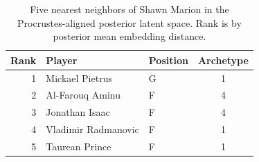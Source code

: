 \begin{table}[htbp]
  \centering\small
  \begin{tabular}{rllc}
    \toprule
    Rank & Player & Position & Archetype \\
    \midrule
    1 & Mickael Pietrus & G & 1 \\
    2 & Al-Farouq Aminu & F & 4 \\
    3 & Jonathan Isaac & F & 4 \\
    4 & Vladimir Radmanovic & F & 1 \\
    5 & Taurean Prince & F & 1 \\
    \bottomrule
  \end{tabular}
  \caption{Five nearest neighbors of Shawn Marion in the Procrustes-aligned posterior latent space. Rank is by posterior mean embedding distance.}
  \label{tab:Shawn_Marion_neighbors}
\end{table}

